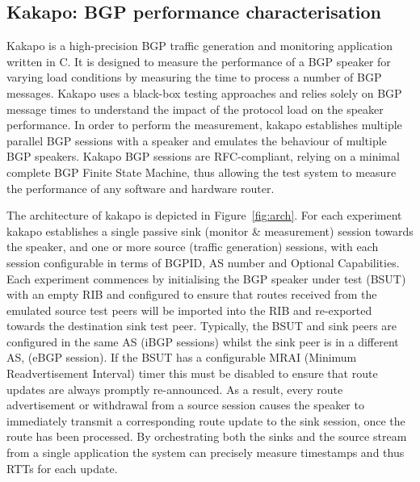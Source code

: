 \subsection{Kakapo: BGP performance characterisation}

Kakapo is a high-precision BGP traffic generation and monitoring application
written in C. It is designed to measure the performance of a BGP speaker for
varying load conditions by measuring the time to process a number of BGP
messages. Kakapo uses a black-box testing approaches and relies solely on BGP
message times to understand the impact of the protocol load on the speaker
performance.  In order to perform the measurement, kakapo establishes multiple
parallel BGP sessions with a speaker and emulates the behaviour of multiple BGP
speakers. Kakapo BGP sessions are RFC-compliant, relying on a minimal complete
BGP Finite State Machine, thus allowing the test system to measure the
performance of any software and hardware router.

The architecture of kakapo is depicted in Figure~\ref{fig:arch}. For each
experiment kakapo establishes a single passive sink (monitor \& measurement)
session towards the speaker, and one or more source (traffic generation)
sessions, with each session configurable in terms of BGPID, AS number and
Optional Capabilities.  Each experiment commences by initialising the BGP
speaker under test (BSUT) with an empty RIB and configured to ensure that
routes received from the emulated source test peers will be imported into the
RIB and re-exported towards the destination sink test peer.  Typically, the
BSUT and sink peers are configured in the same AS (iBGP sessions) whilst the
sink peer is in a different AS, (eBGP session).  If the BSUT has a configurable
MRAI (Minimum Readvertisement Interval) timer this must be disabled to ensure
that route updates are always promptly re-announced.  As a result, every route
advertisement or withdrawal from a source session causes the speaker to
immediately transmit a corresponding route update to the sink session, once the
route has been processed.  By orchestrating both the sinks and the source
stream from a single application the system can precisely measure timestamps
and thus RTTs for each update.


